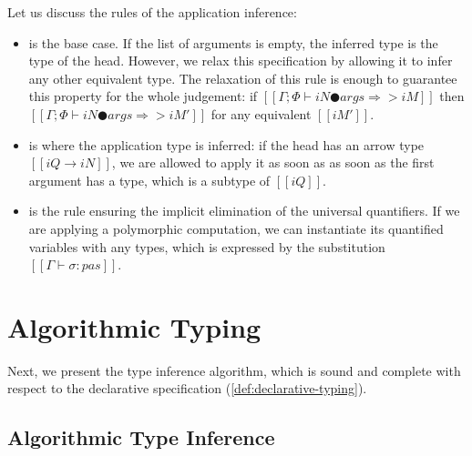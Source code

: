 \documentclass[acmsmall,natbib=false,review,anonymous]{acmart}
\begin{document}
Let us discuss the rules of the application inference:
\begin{itemize}
  \item {} 
    is the base case. If the list of arguments is empty, 
    the inferred type is the type of the head. 
    However, we relax this specification by allowing it to 
    infer any other equivalent type. 
    The relaxation of this rule is enough to guarantee 
    this property for the whole judgement:
    if $[[Γ ; Φ ⊢ iN ● args ⇒> iM]]$ then 
    $[[Γ ; Φ ⊢ iN ● args ⇒> iM']]$ for any equivalent 
    $[[iM']]$.
  \item {}
    is where the application type is inferred: 
    if the head has an arrow type $[[iQ → iN]]$,
     we are allowed to apply it as soon as 
    as soon as the first argument has a type, which is a subtype of $[[iQ]]$.
  \item {}
    is the rule ensuring the implicit elimination of the universal quantifiers. 
    If we are applying a polymorphic computation, 
    we can instantiate its quantified variables with any types,
    which is expressed by the substitution $[[Γ ⊢ σ : {pas}]]$.
\end{itemize}



\section{Algorithmic Typing}

Next, we present the type inference algorithm, 
which is sound and complete with respect to the declarative specification
(\cref{def:declarative-typing}).

\subsection{Algorithmic Type Inference}
\end{document}
